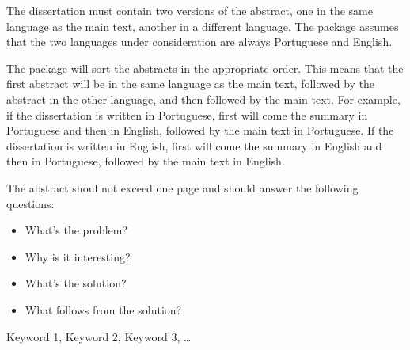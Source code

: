 

The dissertation must contain two versions of the abstract, one in the same language as the main text, another in a different language.  The package assumes that the two languages under consideration are always Portuguese and English.

The package will sort the abstracts in the appropriate order. This means that the first abstract will be in the same language as the main text, followed by the abstract in the other language, and then followed by the main text. For example, if the dissertation is written in Portuguese, first will come the summary in Portuguese and then in English, followed by the main text in Portuguese. If the dissertation is written in English, first will come the summary in English and then in Portuguese, followed by the main text in English.

The abstract shoul not exceed one page and should answer the following questions:

\begin{itemize}
	\item What's the problem?
	\item Why is it interesting?
	\item What's the solution?
	\item What follows from the solution?
\end{itemize}

\begin{keywords}[en]
Keyword 1, Keyword 2, Keyword 3, …
\end{keywords} 
